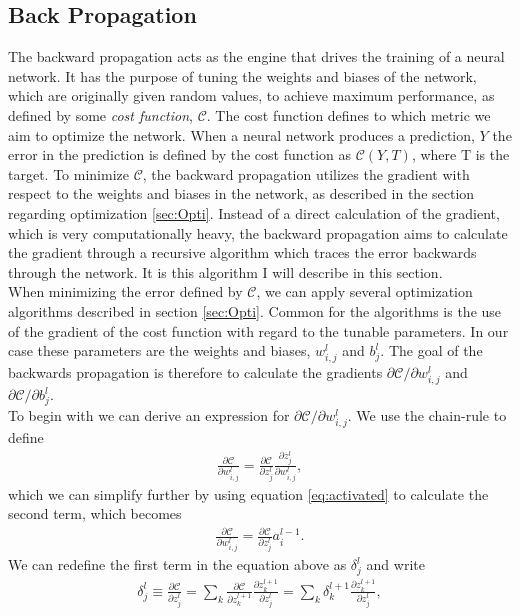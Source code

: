 \subsection{Back Propagation}\label{subsec:BP}
The backward propagation acts as the engine that drives the training of a neural network. It has the purpose
of tuning the weights and biases of the network, which are originally given random values, to achieve maximum performance,
as defined by some \emph{cost function}, $\mathcal{C}$. The cost function defines to which metric we aim to optimize the network. 
When a neural network produces a prediction, $Y$ the error in the prediction
is defined by the cost function as $\mathcal{C}\left(Y, T\right)$, where T is the target. To minimize $\mathcal{C}$, the 
backward propagation utilizes the gradient with respect to the weights and biases in the network, as described in the section 
regarding optimization \ref{sec:Opti}. Instead of a direct calculation of the gradient, which is very computationally heavy, 
the backward propagation aims to calculate the gradient through a recursive algorithm which traces the error backwards through 
the network. It is this algorithm I will describe in this section.
\\
When minimizing the error defined by $\mathcal{C}$, we can apply several optimization algorithms described in 
section \ref{sec:Opti}. Common for the algorithms is the use of the gradient of the cost function with regard to 
the tunable parameters. In our case these parameters are the weights and biases, $w_{i,j}^l$ and $b^l_j$. The goal of 
the backwards propagation is therefore to calculate the gradients $\partial \mathcal{C}/\partial w_{i,j}^l$ and
$\partial \mathcal{C}/\partial b^l_j$. 
\\
To begin with we can derive an expression for $\partial \mathcal{C}/\partial w_{i,j}^l$. We use the chain-rule to define 
\begin{align*}
    \frac{\partial \mathcal{C}}{\partial w_{i,j}^l} = \frac{\partial \mathcal{C}}{\partial z^l_j} \frac{\partial z^l_j}{\partial w_{i,j}^l},
\end{align*}
which we can simplify further by using equation \ref{eq:activated} to calculate the second term, which becomes
\begin{align*}
    \frac{\partial \mathcal{C}}{\partial w_{i,j}^l} = \frac{\partial \mathcal{C}}{\partial z^l_j} a^{l-1}_i.
\end{align*}
We can redefine the first term in the equation above as $\delta_j^l$ and write
\begin{align*}
    \delta_j^l \equiv \frac{\partial \mathcal{C}}{\partial z^l_j}
               = \sum_k \frac{\partial \mathcal{C}}{\partial z^{l+1}_k}\frac{\partial z_k^{l+1}}{\partial z^l_j}  
               = \sum_k \delta_k^{l+1}\frac{\partial z_k^{l+1}}{\partial z^l_j},
\end{align*}
